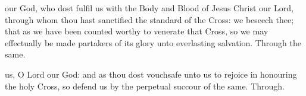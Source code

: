 
\secret
{} our God, who dost fulfil us with the Body and Blood of Jesus Christ our Lord, through whom thou hast sanctified the standard of the Cross: we beseech thee; that as we have been counted worthy to venerate that Cross, so we may effectually be made partakers of its glory unto everlasting salvation. Through the same.


\postcommunion
{} us, O Lord our God: and as thou dost vouchsafe unto us to rejoice in honouring the holy Cross, so defend us by the perpetual succour of the same. Through.



